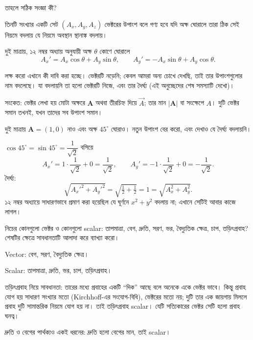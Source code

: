 \documentclass[11pt]{article}
\begin{document}
তাহলে সঠিক সংজ্ঞা কী?

\begin{idea}[ভেক্টরের সংজ্ঞা]
তিনটি সংখ্যার একটি সেট $\left( A_{x}, A_{y}, A_{z} \right)$ ভেক্টরের উপাংশ
বলে গণ্য হবে যদি অক্ষ ঘোরালে তারা ঠিক সেই নিয়মে বদলায় যে নিয়মে অবস্থান
স্থানাঙ্ক বদলায়।

দুই মাত্রায়, ১২ নম্বর অধ্যায় অনুযায়ী অক্ষ $\theta$ কোণে ঘোরালে
\[
  A_{x}' = A_{x}\cos\theta + A_{y}\sin\theta, \qquad
  A_{y}' = -A_{x}\sin\theta + A_{y}\cos\theta .
\]
\end{idea}

লক্ষ করো এখানে কী দাবি করা হচ্ছে। ভেক্টরটি নড়েনি; কেবল আমরা অন্য চোখে দেখছি,
তাই তার উপাংশগুলোর নাম বদলেছে। যা বদলায়নি তা হলো ভেক্টরটি নিজে, এবং তার
দৈর্ঘ্য (এই অনুচ্ছেদের শেষ সমস্যাটি দেখো)।

সংকেত: ভেক্টর লেখা হয় মোটা অক্ষরে $\mathbf{A}$ অথবা তীরচিহ্ন দিয়ে
$\vec{A}$; তার মান $|\mathbf{A}|$ বা সংক্ষেপে $A$। দুটি ভেক্টর সমান তখনই,
যখন তাদের সব উপাংশ সমান।

\begin{example}
দুই মাত্রায় $\mathbf{A} = (1,0)$ নাও এবং অক্ষ $45^{\circ}$ ঘোরাও। নতুন উপাংশ
বের করো, এবং দেখাও যে দৈর্ঘ্য বদলায়নি।
\end{example}

\begin{solbox}
$\cos 45^{\circ} = \sin 45^{\circ} = \dfrac{1}{\sqrt{2}}$ বসিয়ে
\[
  A_{x}' = 1 \cdot \frac{1}{\sqrt{2}} + 0 = \frac{1}{\sqrt{2}}, \qquad
  A_{y}' = -1 \cdot \frac{1}{\sqrt{2}} + 0 = -\frac{1}{\sqrt{2}} .
\]
দৈর্ঘ্য:
\[
  \sqrt{A_{x}'^{2} + A_{y}'^{2}} = \sqrt{\tfrac{1}{2}+\tfrac{1}{2}} = 1
  = \sqrt{A_{x}^{2}+A_{y}^{2}} .
\]
১২ নম্বর অধ্যায়ে সাধারণভাবে প্রমাণ করা হয়েছিল যে ঘূর্ণনে $x^{2}+y^{2}$
বদলায় না; এখানে সেটিই আবার কাজে লাগল।
\end{solbox}

 নিচের কোনগুলো ভেক্টর ও কোনগুলো scalar: তাপমাত্রা, বেগ, দ্রুতি,
সরণ, ভর, বৈদ্যুতিক ক্ষেত্র, চাপ, তড়িৎপ্রবাহ? শেষটির ক্ষেত্রে সাবধানতাটি
আলাদা করে ব্যাখ্যা করো।

\begin{sol}
Vector: বেগ, সরণ, বৈদ্যুতিক ক্ষেত্র।

Scalar: তাপমাত্রা, দ্রুতি, ভর, চাপ, তড়িৎপ্রবাহ।

তড়িৎপ্রবাহ নিয়ে সাবধানতা: তারের মধ্যে প্রবাহের একটি ``দিক'' আছে বলে অনেকে
একে ভেক্টর ভাবে। কিন্তু প্রবাহ যোগ হয় সাধারণ সংখ্যার মতো (Kirchhoff-এর
সংযোগ-বিধি), ভেক্টরের মতো নয়; দুটি তার এক জায়গায় মিললে প্রবাহ দুটি
সামান্তরিক নিয়মে যোগ হয় না। তাই তড়িৎপ্রবাহ scalar। যেটি সত্যিকারের ভেক্টর
সেটি হলো প্রবাহ ঘনত্ব।

দ্রুতি ও বেগের পার্থক্যও একই ধরনের: দ্রুতি হলো বেগের মান, তাই scalar।
\end{sol}
\end{document}
